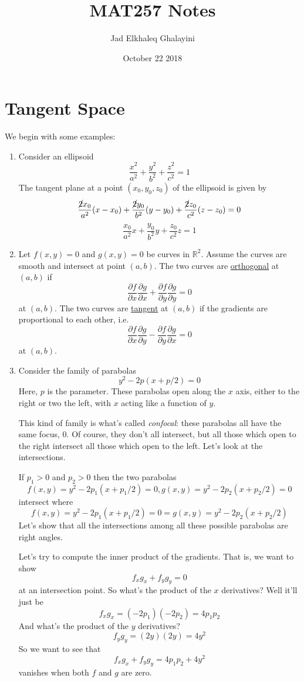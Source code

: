 \documentclass{article}
\title{MAT257 Notes}
\author{Jad Elkhaleq Ghalayini}
\date{October 22 2018}
\newcommand{\reals}[0]{\mathbb{R}}
\newcommand{\prt}[2]{\frac{\partial #1}{\partial #2}}
\begin{document}
\maketitle

\section*{Tangent Space}
We begin with some examples:
\begin{enumerate}

  \item Consider an ellipsoid
  \[\frac{x^2}{a^2} + \frac{y^2}{b^2} + \frac{z^2}{c^2} = 1\]
  The tangent plane at a point \((x_0, y_0, z_0)\) of the ellipsoid is given by
  \[\frac{\cancel{2}x_0}{a^2}(x - x_0) + \frac{\cancel{2}y_0}{b^2}(y - y_0) + \frac{\cancel{2}z_0}{c^2}(z - z_0) = 0\]
  \[\frac{x_0}{a^2}x + \frac{y_0}{b^2}y + \frac{z_0}{c^2}z = 1\]

  \item Let \(f(x, y) = 0\) and \(g(x, y) = 0\) be curves in \(\reals^2\). Assume the curves are smooth and intersect at point \((a, b)\). The two curves are \underline{orthogonal} at \((a, b)\) if
  \[\prt{f}{x}\prt{g}{x} + \prt{f}{y}\prt{g}{y} = 0\]
  at \((a, b)\). The two curves are \underline{tangent} at \((a, b)\) if the gradients are proportional to each other, i.e.
  \[\prt{f}{x}\prt{g}{y} - \prt{f}{y}\prt{g}{x} = 0\]
  at \((a, b)\).

  \item Consider the family of parabolas
  \[y^2 - 2p(x + p/2) = 0\]
  Here, \(p\) is the parameter. These parabolas open along the \(x\) axis, either to the right or two the left, with \(x\) acting like a function of \(y\).

  This kind of family is what's called \textit{confocal}: these parabolas all have the same focus, 0. Of course, they don't all intersect, but all those which open to the right intersect all those which open to the left. Let's look at the intersections.

  If \(p_1 > 0\) and \(p_2 > 0\) then the two parabolas
  \[f(x, y) = y^2 - 2p_1(x + p_1/2) = 0, g(x, y) = y^2 - 2p_2(x + p_2/2) = 0\]
  intersect where
  \[f(x, y) = y^2 - 2p_1(x + p_1/2) = 0 = g(x, y) = y^2 - 2p_2(x + p_2/2)\]
  Let's show that all the intersections among all these possible parabolas are right angles.

  Let's try to compute the inner product of the gradients. That is, we want to show
  \[f_xg_x + f_yg_y = 0\]
  at an intersection point. So what's the product of the \(x\) derivatives? Well it'll just be
  \[f_xg_x = (-2p_1)(-2p_2) = 4p_1p_2\]
  And what's the product of the \(y\) derivatives?
  \[f_yg_y = (2y)(2y) = 4y^2\]
  So we want to see that
  \[f_xg_x + f_yg_y = 4p_1p_2 + 4y^2\]
  vanishes when both \(f\) and \(g\) are zero.


\end{enumerate}
\end{document}
